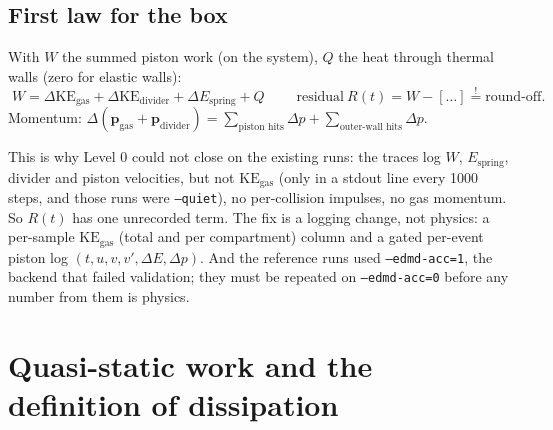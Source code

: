 \documentclass[11pt,a4paper]{article}
\begin{document}
\subsection{First law for the box}
With $W$ the summed piston work (on the system), $Q$ the heat through thermal walls (zero for elastic walls):
\begin{equation}
\boxed{\;W = \Delta \mathrm{KE}_{\mathrm{gas}} + \Delta\mathrm{KE}_{\mathrm{divider}} + \Delta E_{\mathrm{spring}} + Q\;}
\qquad\text{residual}\ R(t) = W - [\ldots] \stackrel{!}{=} \text{round-off}.
\label{eq:ledger}
\end{equation}
Momentum: $\Delta(\mathbf p_{\mathrm{gas}} + \mathbf p_{\mathrm{divider}}) = \sum_{\text{piston hits}}\Delta p + \sum_{\text{outer-wall hits}}\Delta p$.

\begin{why}
This is why Level 0 could not close on the existing runs: the traces log $W$, $E_{\mathrm{spring}}$, divider and piston velocities, but not $\mathrm{KE}_{\mathrm{gas}}$ (only in a stdout line every 1000 steps, and those runs were \texttt{--quiet}), no per-collision impulses, no gas momentum. So $R(t)$ has one unrecorded term. The fix is a logging change, not physics: a per-sample $\mathrm{KE}_{\mathrm{gas}}$ (total and per compartment) column and a gated per-event piston log $(t, u, v, v', \Delta E, \Delta p)$. And the reference runs used \texttt{--edmd-acc=1}, the backend that failed validation; they must be repeated on \texttt{--edmd-acc=0} before any number from them is physics.
\end{why}

\section{Quasi-static work and the definition of dissipation}
\end{document}
